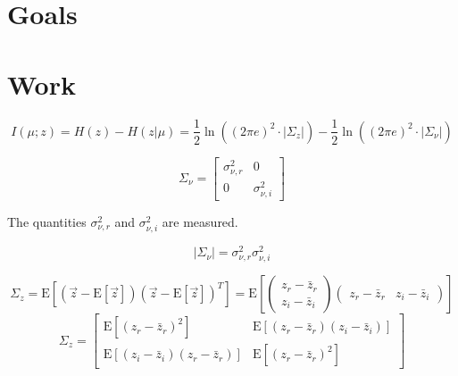 \documentclass{article}         %
\theoremstyle{definition}
\theoremstyle{remark}
\begin{document}

\section{Goals}\label{Goals}



\section{Work}\label{Work}

\begin{equation}
	I\left(\mu;z\right) = H\left(z\right) - H\left(z|\mu\right) 
	= \frac{1}{2}\ln\left(\left(2\pi e\right)^2\cdot\lvert\Sigma_z\rvert\right) - \frac{1}{2}\ln\left(\left(2\pi e\right)^2\cdot\lvert\Sigma_\nu\rvert\right)
\end{equation}

\begin{equation}
	\Sigma_\nu = \left[ \begin{array}{cc}
	\sigma_{\nu,r}^2 & 0 \\
	0 & \sigma_{\nu,i}^2 \end{array} \right]
\end{equation}

The quantities $\sigma_{\nu,r}^2$ and $\sigma_{\nu,i}^2$ are measured.

\begin{equation}
	\lvert\Sigma_\nu\rvert = \sigma_{\nu,r}^2\sigma_{\nu,i}^2
\end{equation}

\begin{equation}
	\Sigma_z = \mathrm{E}\left[\left(\vec{z} - \mathrm{E}\left[\vec{z}\right]\right)\left(\vec{z} - \mathrm{E}\left[\vec{z}\right]\right)^T\right] 
	= \mathrm{E}\left[\left( \begin{array}{c}
	z_r - \bar{z}_r \\
	z_i - \bar{z}_i \end{array} \right)\left( \begin{array}{cc}
	z_r - \bar{z}_r & z_i - \bar{z}_i \end{array} \right)\right]
\end{equation}
\begin{equation}
	\Sigma_z = \left[ \begin{array}{cc}
	\mathrm{E}\left[\left(z_r - \bar{z}_r\right)^2\right] & \mathrm{E}\left[\left(z_r - \bar{z}_r\right)\left(z_i - \bar{z}_i\right)\right] \\
	\mathrm{E}\left[\left(z_i - \bar{z}_i\right)\left(z_r - \bar{z}_r\right)\right] & \mathrm{E}\left[\left(z_r - \bar{z}_r\right)^2\right] \end{array} \right]
\end{equation}
\end{document}
